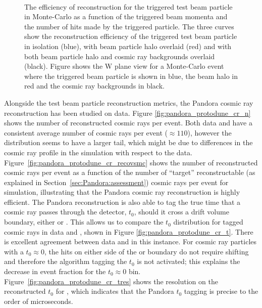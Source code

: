 \begin{figure}[!ht]
\centering
{}
 \\
\caption[Reconstruction efficiency for test beam particle in  per momentum and hits]{The efficiency of reconstruction for the triggered test beam particle in Monte-Carlo as a function of \protect{} the triggered beam momenta and \protect{} the number of hits made by the triggered particle.  The three curves show the reconstruction efficiency of the triggered test beam particle in isolation (blue), with beam particle halo overlaid (red) and with both beam particle halo and cosmic ray backgrounds overlaid (black).  Figure \protect{} shows the W plane view for a Monte-Carlo event where the triggered beam particle is shown in blue, the beam halo in red and the cosmic ray backgrounds in black.}
\label{fig:pandora_protodune_tbrecoeffbrkdwn}
\end{figure}

Alongside the test beam particle reconstruction metrics, the Pandora cosmic ray reconstruction has been studied on data. 
Figure \ref{fig:pandora_protodune_cr_n} shows the number of reconstructed cosmic rays per event.  Both data and  have a consistent average number of cosmic rays per event ($\approx 110$), however the  distribution seems to have a larger tail, which might be due to differences in the cosmic ray profile in the simulation with respect to the data. Figure~\ref{fig:pandora_protodune_cr_recovsmc} shows the number of reconstructed cosmic rays per event as a function of the number of ``target'' reconstructable (as explained in Section~\ref{sec:Pandora:assessment}) cosmic rays per event for  simulation, illustrating that the Pandora cosmic ray reconstruction is highly efficient.  The Pandora reconstruction is also able to tag the true time that a cosmic ray passes through the detector, $t_{0}$, should it cross a drift volume boundary, either  or .  This allows us to compare the $t_{0}$ distribution for tagged cosmic rays in data and , shown in Figure \ref{fig:pandora_protodune_cr_t}.  There is excellent agreement between data and  in this instance.  For cosmic ray particles with a $t_{0} \approx 0$, the hits on either side of the  or  boundary do not require shifting and therefore the algorithm tagging the $t_{0}$ is not activated; this explains the decrease in event fraction for the $t_{0} \approx 0$ bin.  Figure~\ref{fig:pandora_protodune_cr_tres} shows the resolution on the reconstructed $t_{0}$ for , which indicates that the Pandora $t_{0}$ tagging is precise to the order of microseconds.  

